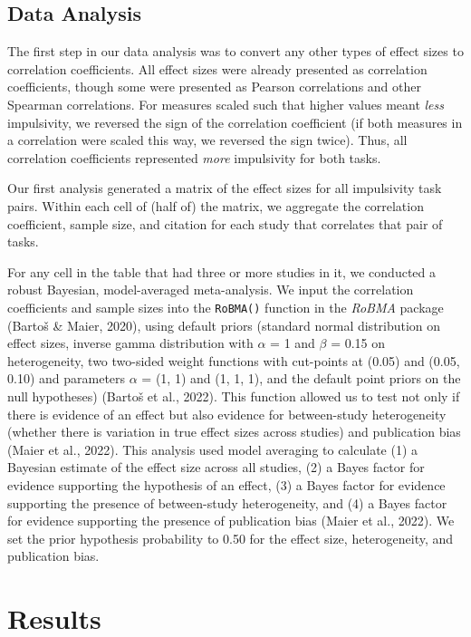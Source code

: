 \documentclass[
  ,pub,floatsintext]{apa6}
\begin{document}
\hypertarget{data-analysis}{%
\subsection{Data Analysis}\label{data-analysis}}

The first step in our data analysis was to convert any other types of effect sizes to correlation coefficients. All effect sizes were already presented as correlation coefficients, though some were presented as Pearson correlations and other Spearman correlations. For measures scaled such that higher values meant \emph{less} impulsivity, we reversed the sign of the correlation coefficient (if both measures in a correlation were scaled this way, we reversed the sign twice). Thus, all correlation coefficients represented \emph{more} impulsivity for both tasks.

Our first analysis generated a matrix of the effect sizes for all impulsivity task pairs. Within each cell of (half of) the matrix, we aggregate the correlation coefficient, sample size, and citation for each study that correlates that pair of tasks.

For any cell in the table that had three or more studies in it, we conducted a robust Bayesian, model-averaged meta-analysis. We input the correlation coefficients and sample sizes into the \texttt{RoBMA()} function in the \emph{RoBMA} package (Bartoš \& Maier, 2020), using default priors (standard normal distribution on effect sizes, inverse gamma distribution with \(\alpha\) = 1 and \(\beta\) = 0.15 on heterogeneity, two two-sided weight functions with cut-points at (0.05) and (0.05, 0.10) and parameters \(\alpha\) = (1, 1) and (1, 1, 1), and the default point priors on the null hypotheses) (Bartoš et al., 2022). This function allowed us to test not only if there is evidence of an effect but also evidence for between-study heterogeneity (whether there is variation in true effect sizes across studies) and publication bias (Maier et al., 2022). This analysis used model averaging to calculate (1) a Bayesian estimate of the effect size across all studies, (2) a Bayes factor for evidence supporting the hypothesis of an effect, (3) a Bayes factor for evidence supporting the presence of between-study heterogeneity, and (4) a Bayes factor for evidence supporting the presence of publication bias (Maier et al., 2022). We set the prior hypothesis probability to 0.50 for the effect size, heterogeneity, and publication bias.

\hypertarget{results}{%
\section{Results}\label{results}}
\end{document}
